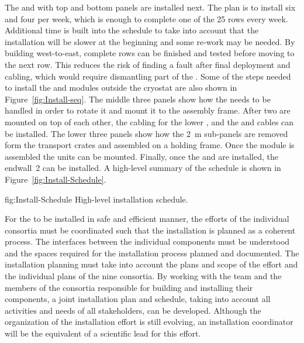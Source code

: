 The  and  with top and bottom  panels are
installed next. The plan is to install six  and four
 per week, which is enough to complete one of the \num{25}
rows every week. Additional time is built into the schedule to take
into account that the installation will be slower at the beginning and
some re-work may be needed. By building west-to-east, complete rows can
be finished and tested before moving to the next row. This reduces the
risk of finding a fault after final  deployment and cabling,
which would require dismantling part of the . Some of the steps
needed to install the  and  modules outside the
cryostat are also shown in Figure~\ref{fig:Install-seq}.  The middle three
panels show how the  needs to be handled in order to rotate
it and mount it to the assembly frame. After two  are
mounted on top of each other, the cabling for the lower , and the
 and  cables can be installed. The
lower three panels show how the \SI{2}{m}  sub-panels are
removed form the transport crates and assembled on a holding frame. Once
the  module is assembled the  units can be
mounted. Finally, once the  and  are installed,
the endwall~2 can be installed. A high-level summary of the schedule
is shown in Figure~\ref{fig:Install-Schedule}.

\begin{dunefigure}{fig:Install-Schedule}
  {High-level installation schedule.}
\end{dunefigure}






For the  to be installed in safe and efficient
manner, the efforts of the individual consortia must be coordinated
such that the installation is planned as a coherent process. The
interfaces between the individual components must be understood
and the spaces required for the installation process planned and
documented. The installation planning must take into account the
plans and scope of the  effort and the individual plans of
the nine consortia. By working with the  team and the
members of the consortia responsible for building and installing their
components, a joint installation plan and schedule, taking into account
all activities and needs of all stakeholders, can be developed. Although
the organization of the installation effort is still evolving, 
an installation coordinator will be the equivalent of a scientific lead for this effort.


